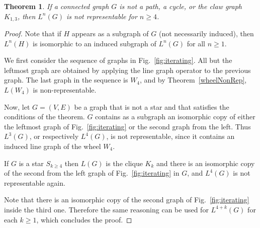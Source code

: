 \documentclass[12pt]{article}
\newtheorem{theorem}{Theorem}
\begin{document}
\begin{theorem} \label{thm:iterating}
If a connected graph $G$ is not a path, a cycle, or the claw graph $K_{1,3}$, then $L^n(G)$ is not representable for $n \geqslant 4$.
\end{theorem}

\begin{proof}
Note that if $H$ appears as a subgraph of $G$ (not necessarily induced), then $L^n(H)$ is isomorphic to an induced subgraph of $L^n(G)$ for all $n \geqslant 1$. 

We first consider the sequence of graphs in Fig.~\ref{fig:iterating}. All but the leftmost graph are obtained by applying the line graph operator to the previous graph. The last graph in the sequence is $W_4$, and by Theorem~\ref{wheelNonRep}, $L(W_4)$ is non-representable. 
 
Now, let  $G=(V,E)$ be a graph that is not a star and that satisfies the conditions of the theorem.  $G$ contains as a subgraph an isomorphic copy of either the leftmost graph of Fig.~\ref{fig:iterating} or the second graph from the left. Thus $L^3(G)$, or respectively $L^4(G)$, is not representable, since it contains an induced line graph of the wheel $W_4$. 

If $G$ is a star $S_{k \geqslant 4}$ then $L(G)$ is the clique $K_{k}$ and there is an isomorphic copy of the second from the left graph of  Fig.~\ref{fig:iterating} in $G$, and $L^4(G)$ is not representable again.

Note that there is an isomorphic copy of the second graph of Fig.~\ref{fig:iterating} inside the third one. Therefore the same reasoning can be used for $L^{4+k}(G)$ for each $k \geqslant 1$, which concludes the proof.
\end{proof}
\end{document}
